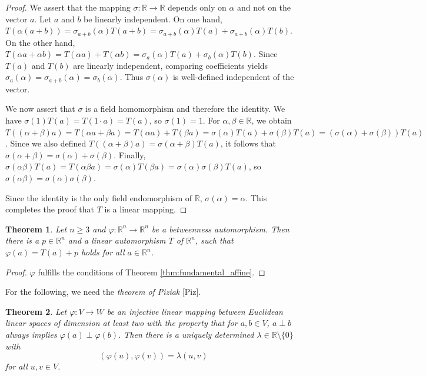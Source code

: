 \documentclass[11pt,a4paper]{article}
\newtheorem{theorem}{Theorem}[section]
\begin{document}
\begin{proof}
We assert that the mapping $\sigma: \mathbb{R} \to \mathbb{R}$ depends only on $\alpha$ and not on the vector $a$. Let $a$ and $b$ be linearly independent. On one hand, $T(\alpha(a+b)) = \sigma_{a+b}(\alpha)T(a+b) = \sigma_{a+b}(\alpha)T(a) + \sigma_{a+b}(\alpha)T(b)$. On the other hand, $T(\alpha a + \alpha b) = T(\alpha a) + T(\alpha b) = \sigma_a(\alpha)T(a) + \sigma_b(\alpha)T(b)$. Since $T(a)$ and $T(b)$ are linearly independent, comparing coefficients yields $\sigma_a(\alpha) = \sigma_{a+b}(\alpha) = \sigma_b(\alpha)$. Thus $\sigma(\alpha)$ is well-defined independent of the vector.

We now assert that $\sigma$ is a field homomorphism and therefore the identity. We have $\sigma(1)T(a) = T(1 \cdot a) = T(a)$, so $\sigma(1) = 1$. For $\alpha, \beta \in \mathbb{R}$, we obtain $T((\alpha + \beta)a) = T(\alpha a + \beta a) = T(\alpha a) + T(\beta a) = \sigma(\alpha)T(a) + \sigma(\beta)T(a) = (\sigma(\alpha) + \sigma(\beta))T(a)$. Since we also defined $T((\alpha + \beta)a) = \sigma(\alpha + \beta)T(a)$, it follows that $\sigma(\alpha + \beta) = \sigma(\alpha) + \sigma(\beta)$. Finally, $\sigma(\alpha\beta)T(a) = T(\alpha\beta a) = \sigma(\alpha)T(\beta a) = \sigma(\alpha)\sigma(\beta)T(a)$, so $\sigma(\alpha\beta) = \sigma(\alpha)\sigma(\beta)$.

Since the identity is the only field endomorphism of $\mathbb{R}$, $\sigma(\alpha) = \alpha$. This completes the proof that $T$ is a linear mapping.
\end{proof}

\begin{theorem} \label{thm:betweenness_auto_linear}
Let $n \ge 3$ and $\varphi: \mathbb{R}^n \to \mathbb{R}^n$ be a betweenness automorphism. Then there is a $p \in \mathbb{R}^n$ and a linear automorphism $T$ of $\mathbb{R}^n$, such that $\varphi(a) = T(a) + p$ holds for all $a \in \mathbb{R}^n$.
\end{theorem}

\begin{proof}
$\varphi$ fulfills the conditions of Theorem \ref{thm:fundamental_affine}.
\end{proof}

For the following, we need the \textit{theorem of Piziak} [Piz].

\begin{theorem} \label{thm:piziak}
Let $\varphi: V \to W$ be an injective linear mapping between Euclidean linear spaces of dimension at least two with the property that for $a, b \in V$, $a \perp b$ always implies $\varphi(a) \perp \varphi(b)$. Then there is a uniquely determined $\lambda \in \mathbb{R} \setminus \{0\}$ with
\begin{equation} \label{eq:piziak}
    (\varphi(u), \varphi(v)) = \lambda(u, v)
\end{equation}
for all $u, v \in V$.
\end{theorem}
\end{document}
